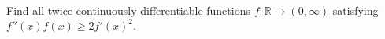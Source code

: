 Find all twice continuously differentiable functions $f: \mathbb{R} \to (0, \infty)$ satisfying $f''(x)f(x) \ge 2f'(x)^2.$